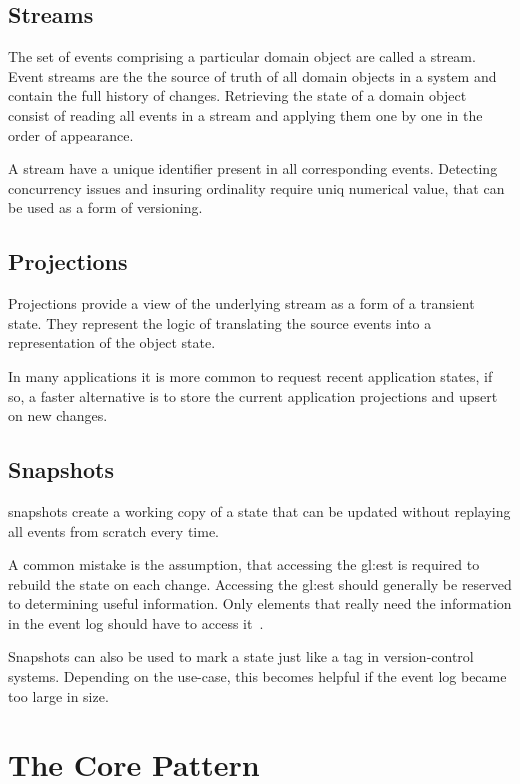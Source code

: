 \subsection{Streams}

The set of events comprising a particular domain object are called a stream. Event streams are the the source of truth of all domain objects in a system and contain the full history of changes. Retrieving the state of a domain object consist of reading all events in a stream and applying them one by one in the order of appearance.

A stream have a unique identifier present in all corresponding events. Detecting concurrency issues and insuring ordinality require uniq numerical value, that can be used as a form of versioning.

\subsection{Projections}

Projections provide a view of the underlying stream as a form of a transient state. They represent the logic of translating the source events into a representation of the object state.

In many applications it is more common to request recent application states, if so, a faster alternative is to store the current application projections and upsert on new changes.

\subsection{Snapshots}\label{subsec:snap}

snapshots create a working copy of a state that can be updated without replaying all events from scratch every time.

A common mistake is the assumption, that accessing the \gls{gl:est} is required to rebuild the state on each change. Accessing the \gls{gl:est} should generally be reserved to determining useful information. Only elements that really need the information in the event log should have to access it~\citep{esvsed}.

Snapshots can also be used to mark a state just like a tag in version-control systems. Depending on the use-case, this becomes helpful if the event log became too large in size.

\section{The Core Pattern}\label{sec:escp}

